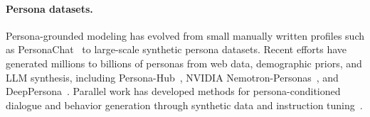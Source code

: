 \paragraph{Persona datasets.} Persona-grounded modeling has evolved from small manually written profiles such as PersonaChat~\citep{zhang2018personachat} to large-scale synthetic persona datasets. Recent efforts have generated millions to billions of personas from web data, demographic priors, and LLM synthesis, including Persona-Hub~\citep{ge2024personahub}, NVIDIA Nemotron-Personas~\citep{nvidia2025nemotron}, and DeepPersona~\citep{deeppersona2025}. Parallel work has developed methods for persona-conditioned dialogue and behavior generation through synthetic data and instruction tuning~\citep{jandaghi2023syntheticpersonachat,wang2025opencharacter,wang2023selfinstruct}. 



